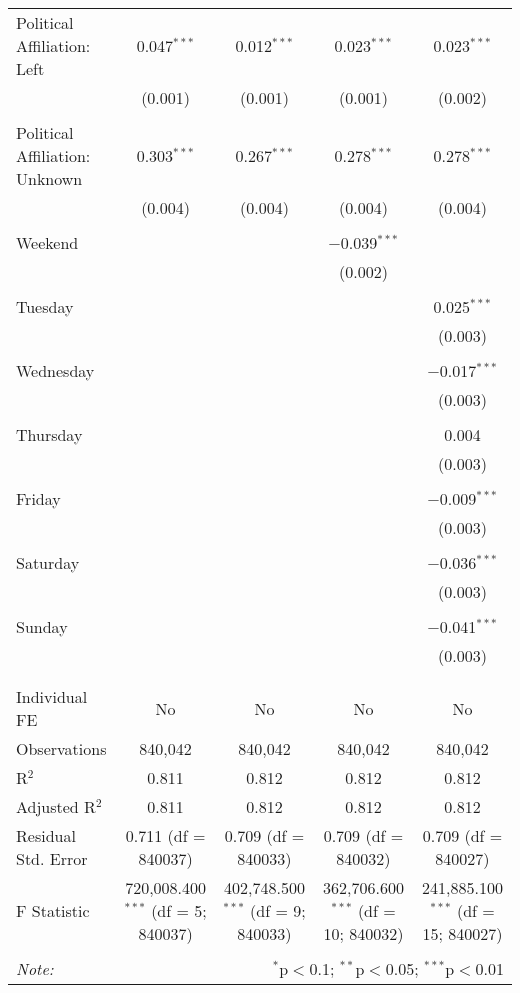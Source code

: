 \documentclass[
]{article}
\begin{document}
\begin{table}[!htbp]
{\begin{tabular}{@{\extracolsep{5pt}}lcccc}
 Political Affiliation: Left & 0.047$^{***}$ & 0.012$^{***}$ & 0.023$^{***}$ & 0.023$^{***}$ \\ 
  & (0.001) & (0.001) & (0.001) & (0.002) \\ 
  & & & & \\ 
 Political Affiliation: Unknown & 0.303$^{***}$ & 0.267$^{***}$ & 0.278$^{***}$ & 0.278$^{***}$ \\ 
  & (0.004) & (0.004) & (0.004) & (0.004) \\ 
  & & & & \\ 
 Weekend &  &  & $-$0.039$^{***}$ &  \\ 
  &  &  & (0.002) &  \\ 
  & & & & \\ 
 Tuesday &  &  &  & 0.025$^{***}$ \\ 
  &  &  &  & (0.003) \\ 
  & & & & \\ 
 Wednesday &  &  &  & $-$0.017$^{***}$ \\ 
  &  &  &  & (0.003) \\ 
  & & & & \\ 
 Thursday &  &  &  & 0.004 \\ 
  &  &  &  & (0.003) \\ 
  & & & & \\ 
 Friday &  &  &  & $-$0.009$^{***}$ \\ 
  &  &  &  & (0.003) \\ 
  & & & & \\ 
 Saturday &  &  &  & $-$0.036$^{***}$ \\ 
  &  &  &  & (0.003) \\ 
  & & & & \\ 
 Sunday &  &  &  & $-$0.041$^{***}$ \\ 
  &  &  &  & (0.003) \\ 
  & & & & \\ 
\hline \\[-1.8ex] 
Individual FE & No & No & No & No \\ 
Observations & 840,042 & 840,042 & 840,042 & 840,042 \\ 
R$^{2}$ & 0.811 & 0.812 & 0.812 & 0.812 \\ 
Adjusted R$^{2}$ & 0.811 & 0.812 & 0.812 & 0.812 \\ 
Residual Std. Error & 0.711 (df = 840037) & 0.709 (df = 840033) & 0.709 (df = 840032) & 0.709 (df = 840027) \\ 
F Statistic & 720,008.400$^{***}$ (df = 5; 840037) & 402,748.500$^{***}$ (df = 9; 840033) & 362,706.600$^{***}$ (df = 10; 840032) & 241,885.100$^{***}$ (df = 15; 840027) \\ 
\hline 
\hline \\[-1.8ex] 
\textit{Note:}  & \multicolumn{4}{r}{$^{*}$p$<$0.1; $^{**}$p$<$0.05; $^{***}$p$<$0.01} \\ 
\end{tabular}
} 
\end{table} 
\newpage
\end{document}

